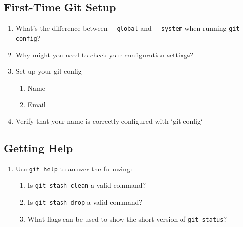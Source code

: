\subsection{First-Time Git Setup}

\begin{enumerate}
	\item What's the difference between \verb`--global` and \verb`--system` when running \verb`git config`?
	\item Why might you need to check your configuration settings?
	\item Set up your git config
	    \begin{enumerate}
		    \item Name
		    \item Email
	    \end{enumerate}
	\item Verify that your name is correctly configured with
	    `git config`
\end{enumerate}

\subsection{Getting Help}

\begin{enumerate}
	\item Use \verb`git help` to answer the following:
	    \begin{enumerate}
	    \item  Is \verb`git stash clean` a valid command?
	    \item  Is \verb`git stash drop` a valid command?
	    \item  What flags can be used to show the short version of \verb`git status`?
	    \end{enumerate}
\end{enumerate}
